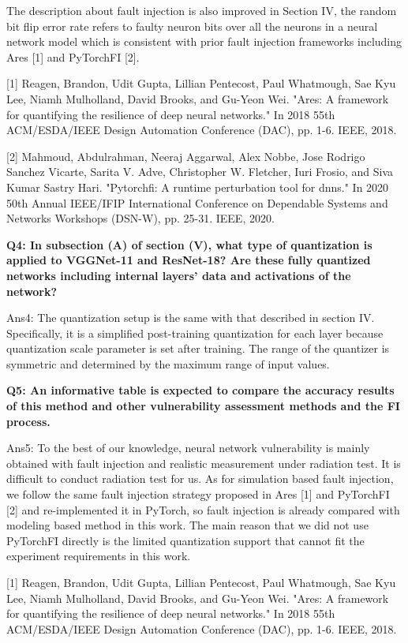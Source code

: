 The description about fault injection is also improved in Section IV, the random bit flip error rate refers to faulty neuron bits over all the neurons in a neural network model which is consistent with prior fault injection frameworks including Ares [1] and PyTorchFI [2].

[1] Reagen, Brandon, Udit Gupta, Lillian Pentecost, Paul Whatmough, Sae Kyu Lee, Niamh Mulholland, David Brooks, and Gu-Yeon Wei. "Ares: A framework for quantifying the resilience of deep neural networks." In 2018 55th ACM/ESDA/IEEE Design Automation Conference (DAC), pp. 1-6. IEEE, 2018.

[2] Mahmoud, Abdulrahman, Neeraj Aggarwal, Alex Nobbe, Jose Rodrigo Sanchez Vicarte, Sarita V. Adve, Christopher W. Fletcher, Iuri Frosio, and Siva Kumar Sastry Hari. "Pytorchfi: A runtime perturbation tool for dnns." In 2020 50th Annual IEEE/IFIP International Conference on Dependable Systems and Networks Workshops (DSN-W), pp. 25-31. IEEE, 2020.

\textbf{Q4: In subsection (A) of section (V), what type of quantization is applied to VGGNet-11 and ResNet-18? Are these fully quantized networks including internal layers’ data and activations of the network?}

Ans4: The quantization setup is the same with that described in section IV. Specifically, it is a simplified post-training quantization for each layer because quantization scale parameter is set after training. The range of the quantizer is symmetric and determined by the maximum range of input values.

\textbf{Q5: An informative table is expected to compare the accuracy results of this method and other vulnerability assessment methods and the FI process.}

Ans5: To the best of our knowledge, neural network vulnerability is mainly obtained with fault injection and realistic measurement under radiation test. It is difficult to conduct radiation test for us. As for simulation based fault injection, we follow the same fault injection strategy proposed in Ares [1] and PyTorchFI [2] and re-implemented it in PyTorch, so fault injection is already compared with modeling based method in this work. The main reason that we did not use PyTorchFI directly is the limited quantization support that cannot fit the experiment requirements in this work.  

[1] Reagen, Brandon, Udit Gupta, Lillian Pentecost, Paul Whatmough, Sae Kyu Lee, Niamh Mulholland, David Brooks, and Gu-Yeon Wei. "Ares: A framework for quantifying the resilience of deep neural networks." In 2018 55th ACM/ESDA/IEEE Design Automation Conference (DAC), pp. 1-6. IEEE, 2018.

